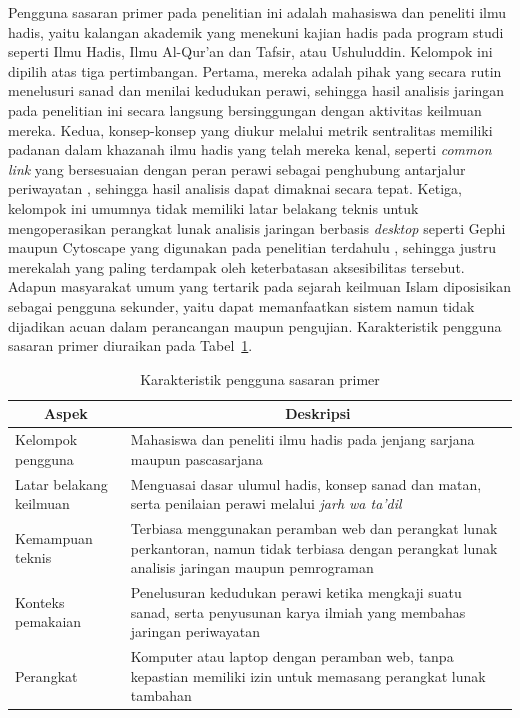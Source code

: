 Pengguna sasaran primer pada penelitian ini adalah mahasiswa dan peneliti ilmu hadis, yaitu kalangan akademik yang menekuni kajian hadis pada program studi seperti Ilmu Hadis, Ilmu Al-Qur'an dan Tafsir, atau Ushuluddin. Kelompok ini dipilih atas tiga pertimbangan. Pertama, mereka adalah pihak yang secara rutin menelusuri sanad dan menilai kedudukan perawi, sehingga hasil analisis jaringan pada penelitian ini secara langsung bersinggungan dengan aktivitas keilmuan mereka. Kedua, konsep-konsep yang diukur melalui metrik sentralitas memiliki padanan dalam khazanah ilmu hadis yang telah mereka kenal, seperti \textit{common link} yang bersesuaian dengan peran perawi sebagai penghubung antarjalur periwayatan \cite{mufid2023track}, sehingga hasil analisis dapat dimaknai secara tepat. Ketiga, kelompok ini umumnya tidak memiliki latar belakang teknis untuk mengoperasikan perangkat lunak analisis jaringan berbasis \textit{desktop} seperti Gephi maupun Cytoscape yang digunakan pada penelitian terdahulu \cite{FAROOQI2024110439}, sehingga justru merekalah yang paling terdampak oleh keterbatasan aksesibilitas tersebut. Adapun masyarakat umum yang tertarik pada sejarah keilmuan Islam diposisikan sebagai pengguna sekunder, yaitu dapat memanfaatkan sistem namun tidak dijadikan acuan dalam perancangan maupun pengujian. Karakteristik pengguna sasaran primer diuraikan pada Tabel~\ref{tab:karakteristik-pengguna}.

\begin{table}[H]
\centering
\caption{Karakteristik pengguna sasaran primer}
\label{tab:karakteristik-pengguna}
\renewcommand{\arraystretch}{1.3}
\begin{tabular}{|p{3.5cm}|p{10.5cm}|}
\hline
\multicolumn{1}{|c|}{\textbf{Aspek}} & \multicolumn{1}{c|}{\textbf{Deskripsi}} \\
\hline
Kelompok pengguna & Mahasiswa dan peneliti ilmu hadis pada jenjang sarjana maupun pascasarjana \\
\hline
Latar belakang keilmuan & Menguasai dasar ulumul hadis, konsep sanad dan matan, serta penilaian perawi melalui \textit{jarh wa ta'dil} \\
\hline
Kemampuan teknis & Terbiasa menggunakan peramban web dan perangkat lunak perkantoran, namun tidak terbiasa dengan perangkat lunak analisis jaringan maupun pemrograman \\
\hline
Konteks pemakaian & Penelusuran kedudukan perawi ketika mengkaji suatu sanad, serta penyusunan karya ilmiah yang membahas jaringan periwayatan \\
\hline
Perangkat & Komputer atau laptop dengan peramban web, tanpa kepastian memiliki izin untuk memasang perangkat lunak tambahan \\
\hline
\end{tabular}
\end{table}

